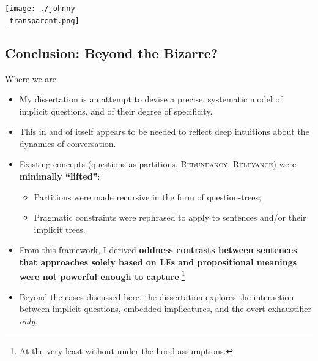 \documentclass[10pt]{beamer}
\begin{document}
\usebackgroundtemplate%
{%
	\texttt{[image: ./johnny\\\_transparent.png]}%
}
\begin{frame}
	\section[Conclusion: Beyond the Bizarre?]{Conclusion: Beyond the Bizarre?}
\end{frame}
\usebackgroundtemplate{}

\begin{frame}{Where we are}
	\begin{itemize}
		\item My dissertation is an attempt to devise a precise, systematic model of implicit questions, and of their degree of specificity.\pause
		\item This in and of itself appears to be needed to reflect deep intuitions about the dynamics of conversation.\pause
		\item Existing concepts (questions-as-partitions, \textsc{Redundancy}, \textsc{Relevance}) were \textbf{minimally ``lifted''}:\pause
		\begin{itemize}
			\item Partitions were made recursive in the form of question-trees;\pause
			\item Pragmatic constraints were rephrased to apply to sentences and/or their implicit trees.\pause
		\end{itemize}
		\item From this framework, I derived \textbf{oddness contrasts between sentences that approaches solely based on LFs and propositional meanings were not powerful enough to capture}.\footnote{At the very least without under-the-hood assumptions.}\pause
		\item Beyond the cases discussed here, the dissertation explores the interaction between implicit questions, embedded implicatures, and the overt exhaustifier \textit{only}.
	\end{itemize}\vspace{3mm}
\end{frame}
\end{document}
